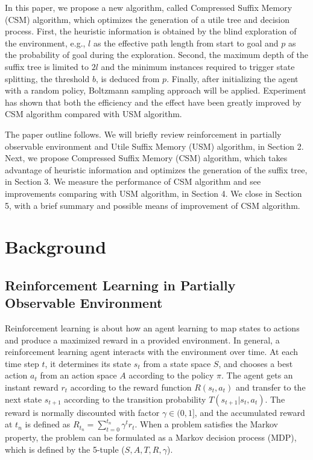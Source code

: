 \documentclass{article}
\begin{document}
In this paper, we propose a new algorithm, called Compressed Suffix Memory (CSM)
algorithm, which optimizes the generation of a utile tree and decision process.
First, the heuristic information is obtained by the blind exploration
of the environment, e.g., $l$ as the effective path length from start to goal
and $p$ as the probability of goal during the exploration. Second, the maximum
depth of the suffix tree is limited to $2l$ and the minimum instances required
to trigger state splitting, the threshold $b$, is deduced from $p$. Finally, after initializing the agent
with a random policy, Boltzmann sampling approach will be applied. Experiment has shown
that both the efficiency and the effect have been greatly improved by CSM algorithm compared
with USM algorithm.

The paper outline follows. We will briefly review reinforcement in partially observable
environment and Utile Suffix Memory (USM) algorithm, in Section 2.
Next, we propose Compressed Suffix Memory (CSM) algorithm, which takes advantage of
heuristic information and optimizes the generation of the suffix tree, in Section 3.
We measure the performance of CSM algorithm and see improvements comparing with USM algorithm, in Section 4.
We close in Section 5, with a brief summary and possible means of improvement of CSM algorithm.

\section{Background}

\subsection{Reinforcement Learning in Partially Observable Environment}

Reinforcement learning is about how an agent learning to map states to actions
and produce a maximized reward in a provided environment. In general, a
reinforcement learning agent interacts with the environment over time.
At each time step $t$, it determines its state $s_t$ from a state space $S$,
and chooses a best action $a_t$ from an action space $A$ according to the policy
$\pi$. The agent gets an instant reward $r_t$ according to the reward function
$R(s_t, a_t)$ and transfer to the next state $s_{t+1}$ according to the transition
probability $T(s_{t+1}|s_t, a_t)$. The reward is normally discounted with factor
$\gamma\in(0,1]$, and the   accumulated reward at $t_n$ is defined as
$R_{t_n}=\sum_{t=0}^{t_n} \gamma^t r_t$. When a problem satisfies the Markov
property, the problem can be formulated as a Markov decision process (MDP), which
is defined by the 5-tuple ($S, A, T, R, \gamma$).
\end{document}
